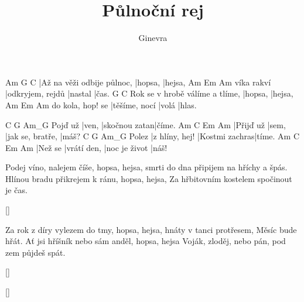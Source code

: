 \documentclass{song}
\author{Ginevra}
\title{Půlnoční rej}
\begin{document}
\strophe
Am                         G       C
|Až na věži odbije půlnoc, |hopsa, |hejsa,
           Am               Em      Am
víka rakví |odkryjem, rejdů |nastal |čas.
                               G       C
Rok se v hrobě válíme a tlíme, |hopsa, |hejsa,
                 Am            Em    Am
do kola, hop! se |těšíme, nocí |volá |hlas.
\endstrophe

        C     G             Am_G
Pojď už |ven, |skočnou zatan|číme.
Am        C     Em               Am
|Přijď už |sem, |jak se, bratře, |máš?
      C              G              Am_G
Polez |z hlíny, hej! |Kostmi zachras|tíme.
Am      C           Em            Am
|Než se |vrátí den, |noc je život |náš!
\endstrophe

\strophe*
Podej víno, nalejem číše, hopsa, hejsa,
smrti do dna připijem na hříchy a špás.
Hlínou bradu přikrejem k ránu, hopsa, hejsa,
Za hřbitovním kostelem spočinout je čas.
\endstrophe

\ref{}

\strophe*
Za rok z díry vylezem do tmy, hopsa, hejsa,
hnáty v tanci protřesem, Měsíc bude hřát.
Ať jsi hříšník nebo sám anděl, hopsa, hejsa
Voják, zloděj, nebo pán, pod zem půjdeš spát.
\endstrophe

\ref{}

\ref{}
\end{document}
